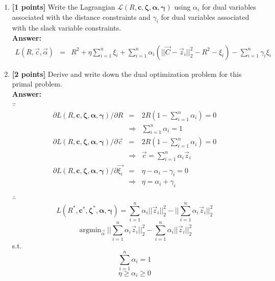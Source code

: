 \documentclass{article}
\DeclareMathOperator*{\argmin}{\mathrm{argmin}}
\begin{document}
\begin{enumerate}[resume]
\item \textbf{[1 points]} Write the Lagrangian $\mathcal{L}(R, \boldsymbol{c}, \boldsymbol{\zeta}, \boldsymbol{\alpha}, \boldsymbol{\gamma})$ using $\alpha_i$ for dual variables associated with the distance constraints and $\gamma_i$ for dual variables associated with the slack variable constraints.\\
\textbf{Answer:}\\
\begin{equation}
\nonumber
\begin{array}{rcl}
L(R,\vec{c},\vec{\alpha}) & = & R^2 + \eta \sum_{i=1}^n \xi_i + \sum_{i=1}^n\alpha_i(||\vec{C}-\vec{z}_i||_2^2-R^2-\xi_i) - \sum_{i=1}^n\gamma_i\xi_i
\end{array}
\end{equation}

\item \textbf{[2 points]} Derive and write down the dual optimization problem for this primal problem. \\
\textbf{Answer:}\\
$\because$
\begin{equation}
\nonumber
\begin{array}{rcl}
\partial L(R, \boldsymbol{c}, \boldsymbol{\zeta}, \boldsymbol{\alpha}, \boldsymbol{\gamma}) / \partial R & = & 2R(1 - \sum_{i=1}^n\alpha_i) = 0 \\
				& \Rightarrow & \sum_{i=1}^n\alpha_i=1 \\
\partial L(R, \boldsymbol{c}, \boldsymbol{\zeta}, \boldsymbol{\alpha}, \boldsymbol{\gamma}) / \partial \vec{c} & = & 2R(1 - \sum_{i=1}^n\alpha_i) = 0 \\
				& \Rightarrow & \vec{c}=\sum_{i=1}^n\alpha_i\vec{z}_i \\
\partial L(R, \boldsymbol{c}, \boldsymbol{\zeta}, \boldsymbol{\alpha}, \boldsymbol{\gamma}) / \partial \vec{\xi_i} & = &  \eta - \alpha_i - \gamma_i = 0 \\
				& \Rightarrow & \eta = \alpha_i + \gamma_i \\
\end{array}
\end{equation}
$\therefore$
$$L(R^*, \boldsymbol{c}^*, \boldsymbol{\zeta}^*, \boldsymbol{\alpha}, \boldsymbol{\gamma}) = \sum_{i=1}^n \alpha_i||\vec{z}_i||_2^2 - ||\sum_{i=1}^n\alpha_i\vec{z}_i||_2^2$$
$$\argmin_{\vec{\alpha}} ||\sum_{i=1}^n\alpha_i\vec{z}_i||_2^2 - \sum_{i=1}^n \alpha_i||\vec{z}_i||_2^2$$
s.t.
$$\sum_{i=1}^n\alpha_i=1$$
$$\eta \geq \alpha_i \geq 0$$

\end{enumerate}
\end{document}
